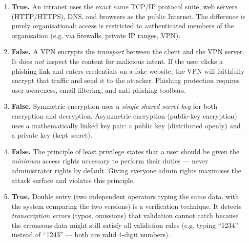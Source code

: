 \documentclass[11pt]{article}
\newcommand{\cle}[1]{{\popxbold\color{popdark}#1}}
\begin{document}
\begin{corrige}
\begin{enumerate}
\item \textbf{True.} An \cle{intranet} uses the exact same TCP/IP protocol suite, web servers (HTTP/HTTPS), DNS, and browsers as the public Internet. The difference is purely organisational: access is restricted to authenticated members of the organisation (e.g. via firewalls, private IP ranges, VPN).
\item \textbf{False.} A \cle{VPN} encrypts the \emph{transport} between the client and the VPN server. It does \emph{not} inspect the content for malicious intent. If the user clicks a phishing link and enters credentials on a fake website, the VPN will faithfully encrypt that traffic and send it to the attacker. Phishing protection requires user awareness, email filtering, and anti-phishing toolbars.
\item \textbf{False.} \cle{Symmetric encryption} uses a \emph{single shared secret key} for both encryption and decryption. \cle{Asymmetric encryption} (public-key encryption) uses a mathematically linked key pair: a public key (distributed openly) and a private key (kept secret).
\item \textbf{False.} The \cle{principle of least privilege} states that a user should be given the \emph{minimum} access rights necessary to perform their duties — never administrator rights by default. Giving everyone admin rights maximises the attack surface and violates this principle.
\item \textbf{True.} \cle{Double entry} (two independent operators typing the same data, with the system comparing the two versions) is a \cle{verification} technique. It detects \emph{transcription errors} (typos, omissions) that validation cannot catch because the erroneous data might still satisfy all validation rules (e.g. typing ``1234'' instead of ``1243'' — both are valid 4-digit numbers).
\end{enumerate}
\end{corrige}
\end{document}
